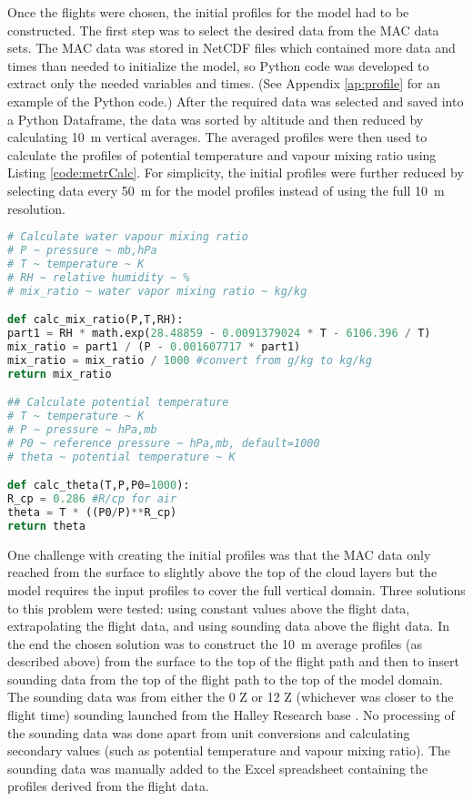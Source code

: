 Once the flights were chosen, the initial profiles for the model had to be constructed. The first step was to select the desired data from the MAC data sets. The MAC data was stored in NetCDF files which contained more data and times than needed to initialize the model, so Python code was developed to extract only the needed variables and times. (See Appendix \ref{ap:profile} for an example of the Python code.) After the required data was selected and saved into a Python Dataframe, the data was sorted by altitude and then reduced by calculating \SI{10}{m} vertical averages. The averaged profiles were then used to calculate the profiles of potential temperature and vapour mixing ratio using Listing \ref{code:metrCalc}. For simplicity, the initial profiles were further reduced by selecting data every \SI{50}{m} for the model profiles instead of using the full \SI{10}{m} resolution.
\newpage
\begin{lstlisting}[language=Python,caption={Python code used to calculate potential temperature and vapour mixing ratio from pressure, absolute temperature, and relative humidity.},label={code:metrCalc}]
# Calculate water vapour mixing ratio
# P ~ pressure ~ mb,hPa
# T ~ temperature ~ K
# RH ~ relative humidity ~ %
# mix_ratio ~ water vapor mixing ratio ~ kg/kg

def calc_mix_ratio(P,T,RH):
part1 = RH * math.exp(28.48859 - 0.0091379024 * T - 6106.396 / T)
mix_ratio = part1 / (P - 0.001607717 * part1)
mix_ratio = mix_ratio / 1000 #convert from g/kg to kg/kg
return mix_ratio

## Calculate potential temperature
# T ~ temperature ~ K
# P ~ pressure ~ hPa,mb
# P0 ~ reference pressure ~ hPa,mb, default=1000
# theta ~ potential temperature ~ K

def calc_theta(T,P,P0=1000):
R_cp = 0.286 #R/cp for air
theta = T * ((P0/P)**R_cp)
return theta
\end{lstlisting}

One challenge with creating the initial profiles was that the MAC data only reached from the surface to slightly above the top of the cloud layers but the model requires the input profiles to cover the full vertical domain. Three solutions to this problem were tested: using constant values above the flight data, extrapolating the flight data, and using sounding data above the flight data. In the end the chosen solution was to construct the \SI{10}{m} average profiles (as described above) from the surface to the top of the flight path and then to insert sounding data from the top of the flight path to the top of the model domain. The sounding data was from either the 0 Z or 12 Z (whichever was closer to the flight time) sounding launched from the Halley Research base \citep{wySounding}. No processing of the sounding data was done apart from unit conversions and calculating secondary values (such as potential temperature and vapour mixing ratio). The sounding data was manually added to the Excel spreadsheet containing the profiles derived from the flight data.


